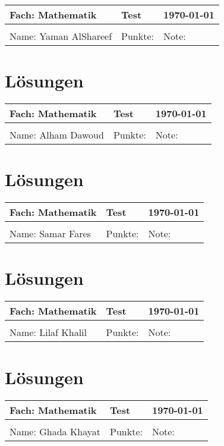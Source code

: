 \documentclass{article}%
\begin{document}
%
\begin{tabular}{|p{5cm}|p{5cm}|p{5cm}|}%
\hline%
Fach: Mathematik&Test&\today\\%
\hline%
&&\\%
Name: Yaman AlShareef&Punkte: &Note: \\%
\hline%
\end{tabular}%
%
\section*{Lösungen}%
%
\newpage

%
\begin{tabular}{|p{5cm}|p{5cm}|p{5cm}|}%
\hline%
Fach: Mathematik&Test&\today\\%
\hline%
&&\\%
Name: Alham Dawoud&Punkte: &Note: \\%
\hline%
\end{tabular}%
%
\section*{Lösungen}%
%
\newpage

%
\begin{tabular}{|p{5cm}|p{5cm}|p{5cm}|}%
\hline%
Fach: Mathematik&Test&\today\\%
\hline%
&&\\%
Name: Samar Fares&Punkte: &Note: \\%
\hline%
\end{tabular}%
%
\section*{Lösungen}%
%
\newpage

%
\begin{tabular}{|p{5cm}|p{5cm}|p{5cm}|}%
\hline%
Fach: Mathematik&Test&\today\\%
\hline%
&&\\%
Name: Lilaf Khalil&Punkte: &Note: \\%
\hline%
\end{tabular}%
%
\section*{Lösungen}%
%
\newpage

%
\begin{tabular}{|p{5cm}|p{5cm}|p{5cm}|}%
\hline%
Fach: Mathematik&Test&\today\\%
\hline%
&&\\%
Name: Ghada Khayat&Punkte: &Note: \\%
\hline%
\end{tabular}%
%
\end{document}
